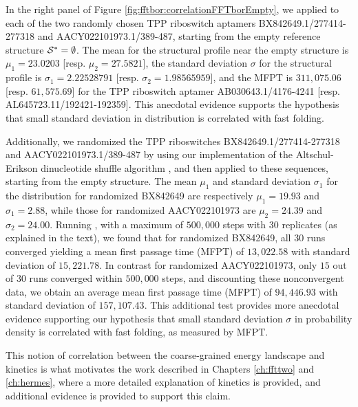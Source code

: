 In the right panel of Figure \ref{fig:fftbor:correlationFFTborEmpty}, we
applied \fftbor to each of the two randomly chosen TPP riboswitch
aptamers BX842649.1/277414-277318 and AACY022101973.1/389-487, starting
from the empty reference structure $\mathcal S^*=\emptyset$.
The mean for the \fftbor structural profile near the empty
structure is $\mu_1=23.0203$  [resp. $\mu_2=27.5821$], the
standard deviation $\sigma$ for the \fftbor structural profile
is $\sigma_1=2.22528791$  [resp. $\sigma_2=1.98565959$], and the \kinfold MFPT is
$311,075.06$ [resp. $61,575.69$] for the TPP riboswitch aptamer
AB030643.1/4176-4241 [resp.  AL645723.11/192421-192359]. This anecdotal evidence supports the hypothesis that small standard deviation in \fftbor distribution is correlated with fast folding.

Additionally, we randomized the TPP riboswitches BX842649.1/277414-277318 and AACY022101973.1/389-487 by using our implementation of the Altschul-Erikson dinucleotide shuffle algorithm
\cite{altschulErikson:dinucleotideShuffle}, and then applied \fftbor to these
sequences, starting from the empty structure.  The mean $\mu_1$ and standard
deviation $\sigma_1$ for the \fftbor distribution for randomized BX842649 are
respectively $\mu_1=19.93$ and $\sigma_1=2.88$, while those for randomized
AACY022101973 are $\mu_2=24.39$ and $\sigma_2=24.00$. Running \kinfold, with a
maximum of $500,000$ steps with $30$ replicates (as explained in the text), we
found
that for randomized BX842649, all $30$ runs converged yielding a mean first passage
time (MFPT) of $13,022.58$ with standard deviation of $15,221.78$. In contrast for
randomized AACY022101973, only $15$ out of $30$ runs converged within $500,000$ steps,
and discounting these nonconvergent data, we obtain an average mean first passage
time (MFPT) of $94,446.93$ with standard deviation of $157,107.43$. This additional
test provides more anecdotal evidence supporting our hypothesis that small
standard deviation $\sigma$ in \fftbor probability density is correlated with fast folding, as measured by MFPT.

This notion of correlation between the coarse-grained energy landscape and
kinetics is what motivates the work described in Chapters \ref{ch:ffttwo}
and \ref{ch:hermes}, where a more detailed explanation of kinetics is provided,
and additional evidence is provided to support this claim.


